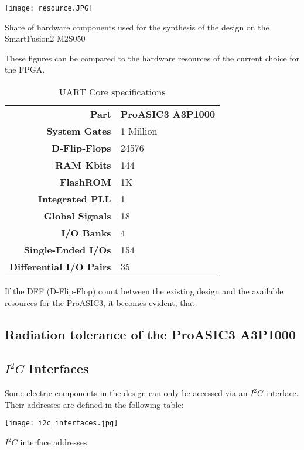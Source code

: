 \begin{table}[H]
	\centering
    \texttt{[image: resource.JPG]}
    \caption[Components]{Share of hardware components used for the synthesis of the design on the SmartFusion2 M2S050}
	\label{tab:resource}
\end{table}

These figures can be compared to the hardware resources of the current choice for the FPGA.

\begin{table}[H]

\caption[]{UART Core specifications \cite{Actel}}
    \label{tab:11}
    
  \begin{center}  
  \begin{tabular}{|r|l|}
  \hline
  \textbf{Part}  & \textbf{ProASIC3 A3P1000} \\ \cline{1-2}
  
  \textbf{System Gates} & 1 Million \\
  \textbf{D-Flip-Flops} & 24576\\ 
  \textbf{RAM Kbits} & 144 \\
  \textbf{FlashROM} & 1K\\
  \textbf{Integrated PLL} & 1 \\
  \textbf{Global Signals} & 18 \\
  \textbf{I/O Banks} & 4 \\
  \textbf{Single-Ended I/Os} & 154 \\
  \textbf{Differential I/O Pairs} & 35 \\
  \hline
  
\end{tabular}
\end{center}
\end{table}

If the DFF (D-Flip-Flop) count between the existing design and the available resources for the ProASIC3, it becomes evident, that 


\subsection{Radiation tolerance of the ProASIC3 A3P1000}

\subsection{\texorpdfstring{$I^2C$}{TEXT} Interfaces}
\label{sec:i2c_interfaces}
Some electric components in the design can only be accessed via an $I^2C$ interface. 
Their addresses are defined in the following table:
\begin{table}[H]
	\centering
    \texttt{[image: i2c\_interfaces.jpg]}
    \caption[$I^2C$ Interfaces]{$I^2C$ interface addresses.}
	\label{tab:i2c_interfaces}
\end{table}
